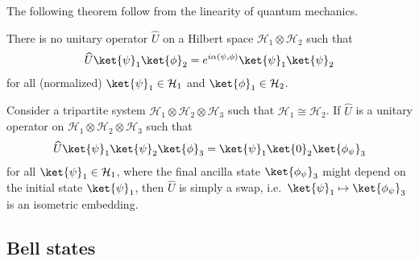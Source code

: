     The following theorem follow from the linearity of quantum mechanics.
    \begin{theorem}[No-cloning]\label{quantum_information:no_cloning}
        There is no unitary operator $\widehat{U}$ on a Hilbert space $\mathcal{H}_1\otimes\mathcal{H}_2$ such that
        \begin{gather}
            \widehat{U}\ket{\psi}_1\ket{\phi}_2 = e^{i\alpha(\psi,\phi)}\ket{\psi}_1\ket{\psi}_2
        \end{gather}
        for all (normalized) $\ket{\psi}_1\in\mathcal{H}_1$ and $\ket{\phi}_1\in\mathcal{H}_2$.
    \end{theorem}
    \begin{theorem}[No-deleting]\label{quantum_information:no_deleting}
        Consider a tripartite system $\mathcal{H}_1\otimes\mathcal{H}_2\otimes\mathcal{H}_3$ such that $\mathcal{H}_1\cong\mathcal{H}_2$. If $\widehat{U}$ is a unitary operator on $\mathcal{H}_1\otimes\mathcal{H}_2\otimes\mathcal{H}_3$ such that
        \begin{gather}
            \widehat{U}\ket{\psi}_1\ket{\psi}_2\ket{\phi}_3=\ket{\psi}_1\ket{0\vphantom{\psi}}_2\ket{\phi_\psi}_3
        \end{gather}
        for all $\ket{\psi}_1\in\mathcal{H}_1$, where the final ancilla state $\ket{\phi_\psi}_3$ might depend on the initial state $\ket{\psi}_1$, then $\widehat{U}$ is simply a swap, i.e.~$\ket{\psi}_1\mapsto\ket{\phi_\psi}_3$ is an isometric embedding.
    \end{theorem}

\subsection{Bell states}


